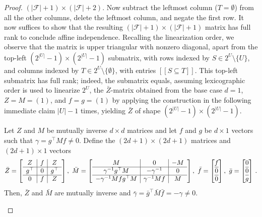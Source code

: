 \documentclass[11pt]{article}
\newcommand{\iv}[1]{\ensuremath{[\![{#1}]\!]}}
\begin{document}
\begin{proof}
$(|\mathcal{F}|+1)\times (|\mathcal{F}|+2)$. Now subtract the leftmost
column ($T=\emptyset$) from all the other columns, 
delete the leftmost column, and negate
the first row. It now suffices to show that 
the resulting $(|\mathcal{F}|+1)\times (|\mathcal{F}|+1)$
matrix has full rank to conclude affine independence. 
Recalling the linearization order, we observe that the matrix is upper
triangular with nonzero diagonal, apart from the top-left 
$(2^{|U|}-1)\times(2^{|U|}-1)$ submatrix, with rows indexed by
$S\in 2^U\setminus\{U\}$, and columns indexed by
$T\in 2^U\setminus\{\emptyset\}$, with entries $\iv{S\subseteq T}$. 
This top-left submatrix has full rank; indeed, the submatrix
equals, assuming lexicographic order is used to linearize $2^U$, the
$\bar Z$-matrix obtained from the base case $d=1$, $Z=M=(1)$, and $f=g=(1)$ 
by applying the construction in the following immediate
claim $|U|-1$ times, yielding $\bar Z$ of shape 
$(2^{|U|}-1)\times (2^{|U|}-1)$. 

\begin{claim}
Let $Z$ and $M$ be mutually inverse $d\times d$ matrices and 
let $f$ and $g$ be $d\times 1$ vectors such that $\gamma=g^\top M f\neq 0$. 
Define the $(2d+1)\times(2d+1)$ matrices and $(2d+1)\times 1$ vectors
\[
\bar Z=
\left[\begin{array}{c|c|c}
Z&f&Z\\\hline
g^\top&0&g^\top\\\hline
0&f&Z\\
\end{array}\right],\ 
\bar M=
\left[\begin{array}{c|c|c}
M&0&-M\\\hline
\gamma^{-1} g^\top M&-\gamma^{-1}&0\\\hline
-\gamma^{-1} Mfg^\top M&\gamma^{-1} Mf&M\\
\end{array}\right],\ 
\bar f=
\left[\begin{array}{@{}c@{}}
f\\\hline
0\\\hline
0
\end{array}\right],\ 
\bar g=
\left[\begin{array}{@{}c@{}}
0\\\hline
0\\\hline
g
\end{array}\right]\,.
\]
Then, $\bar Z$ and $\bar M$ 
are mutually inverse and $\bar\gamma=\bar g^\top \bar M \bar f=-\gamma\neq 0$. 
\end{claim}


\end{proof}
\end{document}
